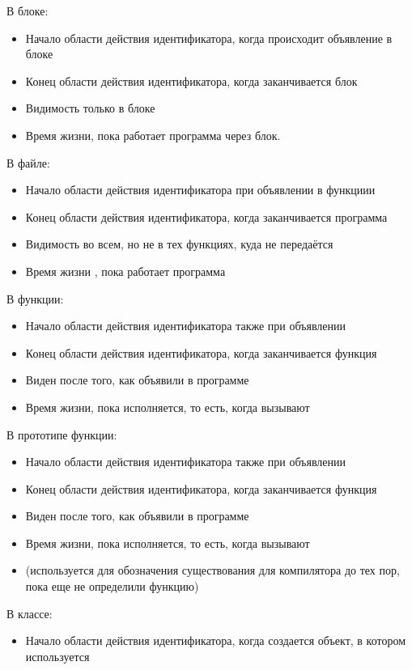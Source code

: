 \documentclass[14pt]{extarticle}
\begin{document}
\begin{enumerate}
	      В блоке:
	      \begin{itemize}
		      \item Начало области действия идентификатора, когда происходит объявление в блоке
		      \item Конец области действия идентификатора, когда заканчивается блок
		      \item Видимость только в блоке
		      \item Время жизни, пока работает программа через блок.
	      \end{itemize}
	      В файле:
	      \begin{itemize}
		      \item Начало области действия идентификатора при объявлении в функциии
		      \item Конец области действия идентификатора, когда заканчивается программа
		      \item Видимость во всем, но не в тех функциях, куда не передаётся
		      \item Время жизни , пока работает программа
	      \end{itemize}
	      В функции:
	      \begin{itemize}
		      \item Начало области действия идентификатора также при объявлении
		      \item Конец области действия идентификатора, когда заканчивается функция
		      \item Виден после того, как объявили в программе
		      \item Время жизни, пока исполняется, то есть, когда вызывают
	      \end{itemize}
	      В прототипе функции:
	      \begin{itemize}
		      \item Начало области действия идентификатора также при объявлении
		      \item Конец области действия идентификатора, когда заканчивается функция
		      \item Виден после того, как объявили в программе
		      \item Время жизни, пока исполняется, то есть, когда вызывают
		      \item (используется для обозначения существования для компилятора до тех пор, пока еще не определили функцию)
	      \end{itemize}
	      В классе:
	      \begin{itemize}
		      \item Начало области действия идентификатора, когда создается объект, в котором используется

\end{itemize}
\end{enumerate}
\end{document}
